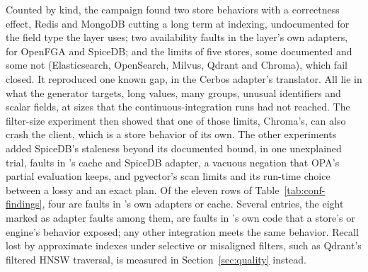 Counted by kind, the campaign found two store behaviors with a correctness effect, Redis and MongoDB
cutting a long term at indexing, undocumented for the field type the layer uses; two availability
faults in the layer's own adapters, for OpenFGA and SpiceDB; and the limits of five stores, some documented and some not
(Elasticsearch, OpenSearch, Milvus, Qdrant and Chroma), which fail closed. It reproduced one known
gap, in the Cerbos adapter's translator. All lie in what the generator targets, long values, many
groups, unusual identifiers and scalar fields, at sizes that the continuous-integration runs had not
reached. The filter-size experiment then showed that one of those limits, Chroma's, can also crash
the client, which is a store behavior of its own. The other experiments added SpiceDB's staleness
beyond its documented bound, in one unexplained trial, faults in \sys{}'s cache and SpiceDB adapter, a vacuous
negation that OPA's partial evaluation keeps, and pgvector's scan limits and its run-time choice
between a lossy and an exact plan. Of the eleven rows of Table~\ref{tab:conf-findings}, four are faults in \sys{}'s own adapters or cache. Several entries, the eight marked as
adapter faults among them, are faults in \sys{}'s own code that a store's or engine's behavior
exposed; any other integration meets the same behavior. Recall lost by approximate indexes under
selective or misaligned filters, such as Qdrant's filtered HNSW traversal, is measured in
Section~\ref{sec:quality} instead.

